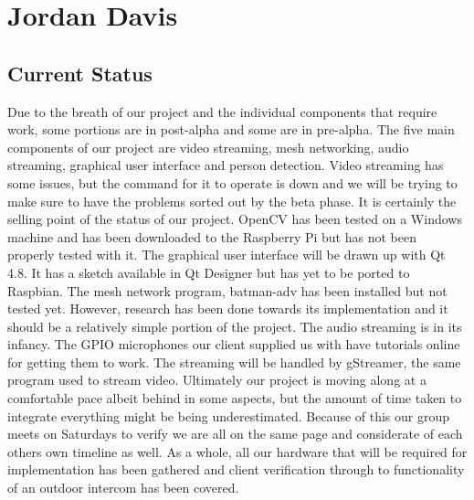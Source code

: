 \documentclass[onecolumn, draftclsnofoot,10pt, compsoc]{IEEEtran}
\begin{document}
\section{Jordan Davis}

\subsection{Current Status}
Due to the breath of our project and the individual components that require work, some portions are in post-alpha and some are in pre-alpha. The five main components of our project are video streaming, mesh networking, audio streaming, graphical user interface and person detection. Video streaming has some issues, but the command for it to operate is down and we will be trying to make sure to have the problems sorted out by the beta phase. It is certainly the selling point of the status of our project. OpenCV has been tested on a Windows machine and has been downloaded to the Raspberry Pi but has not been properly tested with it. The graphical user interface will be drawn up with Qt 4.8. It has a sketch available in Qt Designer but has yet to be ported to Raspbian. The mesh network program, batman-adv has been installed but not tested yet. However, research has been done towards its implementation and it should be a relatively simple portion of the project. The audio streaming is in its infancy. The GPIO microphones our client supplied us with have tutorials online for getting them to work. The streaming will be handled by gStreamer, the same program used to stream video. Ultimately our project is moving along at a comfortable pace albeit behind in some aspects, but the amount of time taken to integrate everything might be being underestimated. Because of this our group meets on Saturdays to verify we are all on the same page and considerate of each others own timeline as well. As a whole, all our hardware that will be required for implementation has been gathered and client verification through to functionality of an outdoor intercom has been covered.
\end{document}
